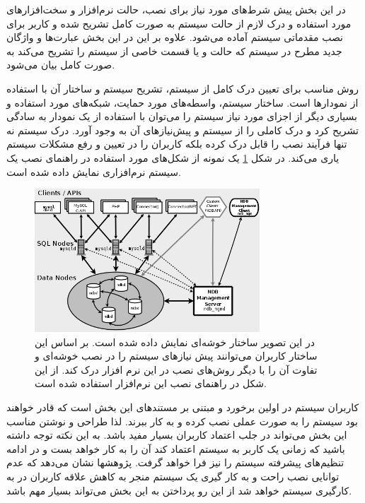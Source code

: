    در این بخش پیش شرط‌های مورد نیاز برای نصب، حالت نرم‌افزار و سخت‌افزارهای مورد
   استفاده و درک لازم از حالت سیستم به صورت کامل تشریح شده و کاربر برای نصب
   مقدماتی سیستم آماده می‌شود. علاوه بر این در این بخش عبارت‌ها و واژگان جدید
   مطرح در سیستم که حالت و یا قسمت خاصی از سیستم را تشریح می‌کند به صورت کامل
   بیان می‌شود.

   روش مناسب برای تعیین درک کامل از سیستم، تشریح سیستم و ساختار آن با
   استفاده از نمودارها است.
   ساختار سیستم، واسطه‌های مورد حمایت، شبکه‌های مورد استفاده و بسیاری دیگر از
   اجزای مورد نیاز سیستم را می‌توان با استفاده از یک نمودار به سادگی تشریح
   کرد و درک کاملی را از سیستم و پیش‌نیازهای آن به وجود آورد. درک سیستم نه تنها
   فرآیند نصب را قابل درک کرده بلکه کاربران را در تعیین و رفع مشکلات سیستم یاری
   می‌کند. در شکل 
   \ref{تصویر-ساختار-خوشه-پایگاه-داده}
    یک نمونه از شکل‌های مورد
   استفاده در راهنمای نصب یک سیستم نرم‌افزاری نمایش داده شده است.
  \begin{figure}
    \centering
    \includegraphics[width=0.75\textwidth]{image/mysql-cluster-install.png}
    \caption[ساختار خوشه‌ای پایگاه داده]
    {
      در این تصویر ساختار خوشه‌ای  نمایش داده شده است. بر اساس این
      ساختار کاربران می‌توانند پیش نیازهای سیستم را در نصب خوشه‌ای و تفاوت آن را
      با دیگر روش‌های نصب در این نرم افزار درک کند.
      از این شکل در راهنمای نصب این نرم‌افزار استفاده شده است.
    }
    \label{تصویر-ساختار-خوشه-پایگاه-داده}
  \end{figure}
  
   کاربران سیستم در اولین برخورد و مبتنی بر مستندهای این بخش است که قادر خواهند بود
   سیستم را به صورت عملی نصب کرده و به کار ببرند. لذا طراحی و نوشتن مناسب این بخش
   می‌تواند در جلب اعتماد کاربران بسیار مفید باشد. به این نکته توجه داشته باشید
   که زمانی یک کاربر به سیستم اعتماد کند آن را به کار خواهد بست و در ادامه
   تنظیم‌های پیشرفته سیستم را نیز فرا خواهد گرفت. پژوهشها نشان می‌دهد که عدم
   توانایی نصب راحت و به کار گیری یک سیستم منجر به کاهش علاقه کاربران در به
   کارگیری سیستم خواهد شد از این رو پرداختن به این بخش می‌تواند بسیار مهم باشد.

